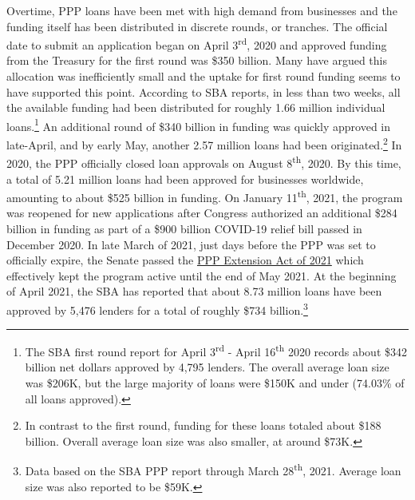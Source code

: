 \documentclass[11pt]{article} %
\begin{document}
Overtime, PPP loans have been met with high demand from businesses and the funding itself has been distributed in discrete rounds, or tranches. The official date to submit an application began on April 3\textsuperscript{rd}, 2020 and approved funding from the Treasury for the first round was \$350 billion. Many have argued this allocation was inefficiently small and the uptake for first round funding seems to have supported this point. According to SBA reports, in less than two weeks, all the available funding had been distributed for roughly 1.66 million individual loans.\footnote{The SBA first round report for April 3\textsuperscript{rd} - April 16\textsuperscript{th} 2020 records about \$342 billion net dollars approved by 4,795 lenders. The overall average loan size was \$206K, but the large majority of loans were \$150K and under (74.03\% of all loans approved).} An additional round of \$340 billion in funding was quickly approved in late-April, and by early May, another 2.57 million loans had been originated.\footnote{In contrast to the first round, funding for these loans totaled about \$188 billion. Overall average loan size was also smaller, at around \$73K.} In 2020, the PPP officially closed loan approvals on August 8\textsuperscript{th}, 2020. By this time, a total of 5.21 million loans had been approved for businesses worldwide, amounting to about \$525 billion in funding. On January 11\textsuperscript{th}, 2021, the program was reopened for new applications after Congress authorized an additional \$284 billion in funding as part of a \$900 billion COVID-19 relief bill passed in December 2020. In late March of 2021, just days before the PPP was set to officially expire, the Senate passed the \href{https://www.congress.gov/bill/117th-congress/house-bill/1799}{PPP Extension Act of 2021} which effectively kept the program active until the end of May 2021. At the beginning of April 2021, the SBA has reported that about 8.73 million loans have been approved by 5,476 lenders for a total of roughly \$734 billion.\footnote{Data based on the SBA PPP report through March 28\textsuperscript{th}, 2021. Average loan size was also reported to be \$59K.}
\end{document}
